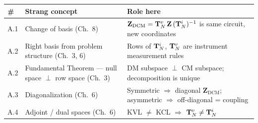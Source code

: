 \begin{statebox}
\centering
\begin{tabular}{@{}p{1cm}p{3cm}p{9cm}@{}}
    \toprule
    \textbf{\#} & \textbf{Strang concept} & \textbf{Role here} \\
    \midrule
    A.1 & Change of basis (Ch.~8) &
          $\mathbf{Z}_{\mathrm{DCM}} = \mathbf{T}^{v}_{N}\,\mathbf{Z}\,(\mathbf{T}^{i}_{N})^{-1}$
          is same circuit, new coordinates \\
    \addlinespace
    A.2 & Right basis from problem structure (Ch.~3, 6) &
          Rows of $\mathbf{T}^{i}_{N}$, $\mathbf{T}^{v}_{N}$ are instrument measurement rules \\
    \addlinespace
    A.2 & Fundamental Theorem — null space $\perp$ row space (Ch.~3) &
          DM subspace $\perp$ CM subspace; decomposition is unique \\
    \addlinespace
    A.3 & Diagonalization (Ch.~6) &
          Symmetric $\Rightarrow$ diagonal $\mathbf{Z}_{\mathrm{DCM}}$;
          asymmetric $\Rightarrow$ off-diagonal = coupling \\
    \addlinespace
    A.4 & Adjoint / dual spaces (Ch.~6) &
          KVL $\neq$ KCL $\Rightarrow$ $\mathbf{T}^{v}_{N} \neq \mathbf{T}^{i}_{N}$ \\
    \bottomrule
\end{tabular}
\end{statebox}

